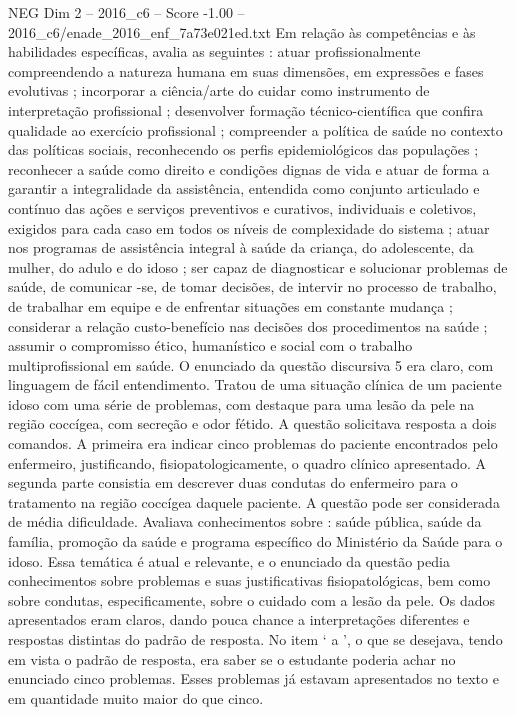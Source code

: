 \begin{textsample}{NEG Dim 2 – 2016\_c6 – Score -1.00 – 2016\_c6/enade\_2016\_enf\_7a73e021ed.txt}
Em relação às competências e às habilidades específicas, avalia as seguintes : atuar profissionalmente compreendendo a natureza humana em suas dimensões, em expressões e fases evolutivas ; incorporar a ciência/arte do cuidar como instrumento de interpretação profissional ; desenvolver formação técnico-científica que confira qualidade ao exercício profissional ; compreender a política de saúde no contexto das políticas sociais, reconhecendo os perfis epidemiológicos das populações ; reconhecer a saúde como direito e condições dignas de vida e atuar de forma a garantir a integralidade da assistência, entendida como conjunto articulado e contínuo das ações e serviços preventivos e curativos, individuais e coletivos, exigidos para cada caso em todos os níveis de complexidade do sistema ; atuar nos programas de assistência integral à saúde da criança, do adolescente, da mulher, do adulo e do idoso ; ser capaz de diagnosticar e solucionar problemas de saúde, de comunicar -se, de tomar decisões, de intervir no processo de trabalho, de trabalhar em equipe e de enfrentar situações em constante mudança ; considerar a relação custo-benefício nas decisões dos procedimentos na saúde ; assumir o compromisso ético, humanístico e social com o trabalho multiprofissional em saúde.
O enunciado da questão discursiva 5 era claro, com linguagem de fácil entendimento.
Tratou de uma situação clínica de um paciente idoso com uma série de problemas, com destaque para uma lesão da pele na região coccígea, com secreção e odor fétido.
A questão solicitava resposta a dois comandos.
A primeira era indicar cinco problemas do paciente encontrados pelo enfermeiro, justificando, fisiopatologicamente, o quadro clínico apresentado.
A segunda parte consistia em descrever duas condutas do enfermeiro para o tratamento na região coccígea daquele paciente.
A questão pode ser considerada de média dificuldade.
Avaliava conhecimentos sobre : saúde pública, saúde da família, promoção da saúde e programa específico do Ministério da Saúde para o idoso.
Essa temática é atual e relevante, e o enunciado da questão pedia conhecimentos sobre problemas e suas justificativas fisiopatológicas, bem como sobre condutas, especificamente, sobre o cuidado com a lesão da pele.
Os dados apresentados eram claros, dando pouca chance a interpretações diferentes e respostas distintas do padrão de resposta.
No item ‘ a ’, o que se desejava, tendo em vista o padrão de resposta, era saber se o estudante poderia achar no enunciado cinco problemas.
Esses problemas já estavam apresentados no texto e em quantidade muito maior do que cinco.

\end{textsample}
